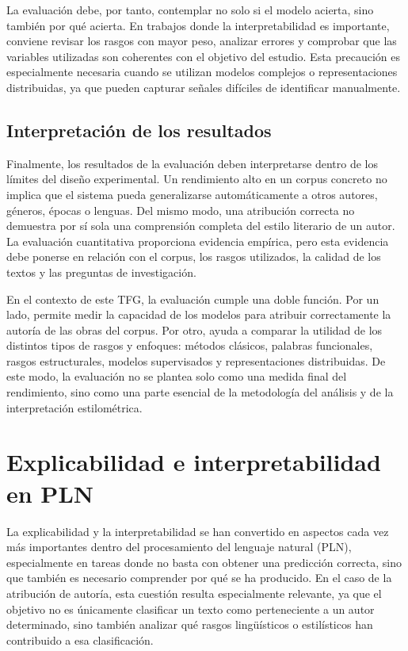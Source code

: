 \documentclass[IB]{TFUOC}%
\begin{document}
La evaluación debe, por tanto, contemplar no solo si el modelo acierta, sino también por qué acierta. En trabajos donde la interpretabilidad es importante, conviene revisar los rasgos con mayor peso, analizar errores y comprobar que las variables utilizadas son coherentes con el objetivo del estudio. Esta precaución es especialmente necesaria cuando se utilizan modelos complejos o representaciones distribuidas, ya que pueden capturar señales difíciles de identificar manualmente.

\subsection{Interpretación de los resultados}

Finalmente, los resultados de la evaluación deben interpretarse dentro de los límites del diseño experimental. Un rendimiento alto en un corpus concreto no implica que el sistema pueda generalizarse automáticamente a otros autores, géneros, épocas o lenguas. Del mismo modo, una atribución correcta no demuestra por sí sola una comprensión completa del estilo literario de un autor. La evaluación cuantitativa proporciona evidencia empírica, pero esta evidencia debe ponerse en relación con el corpus, los rasgos utilizados, la calidad de los textos y las preguntas de investigación.

En el contexto de este TFG, la evaluación cumple una doble función. Por un lado, permite medir la capacidad de los modelos para atribuir correctamente la autoría de las obras del corpus. Por otro, ayuda a comparar la utilidad de los distintos tipos de rasgos y enfoques: métodos clásicos, palabras funcionales, rasgos estructurales, modelos supervisados y representaciones distribuidas. De este modo, la evaluación no se plantea solo como una medida final del rendimiento, sino como una parte esencial de la metodología del análisis y de la interpretación estilométrica.

\section{Explicabilidad e interpretabilidad en PLN}

La explicabilidad y la interpretabilidad se han convertido en aspectos cada vez más importantes dentro del procesamiento del lenguaje natural (PLN), especialmente en tareas donde no basta con obtener una predicción correcta, sino que también es necesario comprender por qué se ha producido. En el caso de la atribución de autoría, esta cuestión resulta especialmente relevante, ya que el objetivo no es únicamente clasificar un texto como perteneciente a un autor determinado, sino también analizar qué rasgos lingüísticos o estilísticos han contribuido a esa clasificación.
\end{document}

